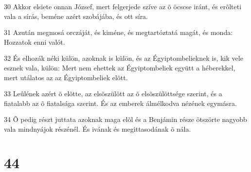 \par 30 Akkor elsiete onnan József, mert felgerjede szíve az õ öcscse iránt, és erõlteti vala a sírás, beméne azért szobájába, és ott síra.
\par 31 Azután megmosá orczáját, és kiméne, és megtartóztatá magát, és monda: Hozzatok enni valót.
\par 32 És elhozák néki külön, azoknak is külön, és az Égyiptombelieknek is, kik vele esznek vala, külön: Mert nem ehettek az Égyiptombeliek együtt a héberekkel, mert utálatos az az Égyiptombeliek elõtt.
\par 33 Leûlének azért õ elõtte, az elsõszülött az õ elsõszülöttsége szerint, és a fiatalabb az õ fiatalsága szerint. És az emberek álmélkodva nézének egymásra.
\par 34 Õ pedig részt juttata azoknak maga elõl és a Benjámin része ötszörte nagyobb vala mindnyájok részénél. És ivának és megittasodának õ nála.

\chapter{44}

